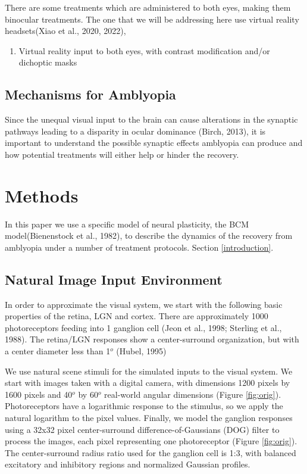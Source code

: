 \documentclass[
  onecolumn]{article}
\providecommand{\tightlist}{%
  \setlength{\itemsep}{0pt}\setlength{\parskip}{0pt}}
\begin{document}
There are some treatments which are administered to both eyes, making
them binocular treatments. The one that we will be addressing here use
virtual reality headsets(Xiao et al., 2020, 2022),

\begin{enumerate}
\def\labelenumi{\arabic{enumi}.}
\setcounter{enumi}{3}
\tightlist
\item
  Virtual reality input to both eyes, with contrast modification and/or
  dichoptic masks
\end{enumerate}

\hypertarget{mechanisms-for-amblyopia}{%
\subsection{Mechanisms for Amblyopia}\label{mechanisms-for-amblyopia}}

Since the unequal visual input to the brain can cause alterations in the
synaptic pathways leading to a disparity in ocular dominance (Birch,
2013), it is important to understand the possible synaptic effects
amblyopia can produce and how potential treatments will either help or
hinder the recovery.

\hypertarget{methods}{%
\section{Methods}\label{methods}}

In this paper we use a specific model of neural plasticity, the BCM
model(Bienenstock et al., 1982), to describe the dynamics of the
recovery from amblyopia under a number of treatment protocols. Section
\ref{introduction}.

\hypertarget{natural-image-input-environment}{%
\subsection{Natural Image Input
Environment}\label{natural-image-input-environment}}

In order to approximate the visual system, we start with the following
basic properties of the retina, LGN and cortex. There are approximately
1000 photoreceptors feeding into 1 ganglion cell (Jeon et al., 1998;
Sterling et al., 1988). The retina/LGN responses show a center-surround
organization, but with a center diameter less than 1\(^o\) (Hubel, 1995)

We use natural scene stimuli for the simulated inputs to the visual
system. We start with images taken with a digital camera, with
dimensions 1200 pixels by 1600 pixels and 40\(^o\) by 60\(^o\)
real-world angular dimensions (Figure \ref{fig:orig}). Photoreceptors
have a logarithmic response to the stimulus, so we apply the natural
logarithm to the pixel values. Finally, we model the ganglion responses
using a 32x32 pixel center-surround difference-of-Gaussians (DOG) filter
to process the images, each pixel representing one photoreceptor (Figure
\ref{fig:orig}). The center-surround radius ratio used for the ganglion
cell is 1:3, with balanced excitatory and inhibitory regions and
normalized Gaussian profiles.
\end{document}
